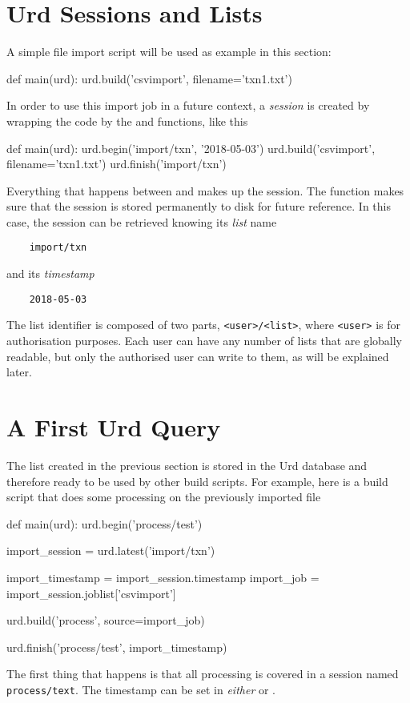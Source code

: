 \section{Urd Sessions and Lists}
A simple file import script will be used as example in this section:
\begin{python}
def main(urd):
    urd.build('csvimport', filename='txn1.txt')
\end{python}
In order to use this import job in a future context,
a \textsl{session} is created by wrapping the code by
the  and  functions, like this
\begin{python}
def main(urd):
    urd.begin('import/txn', '2018-05-03')
    urd.build('csvimport', filename='txn1.txt')
    urd.finish('import/txn')
\end{python}
Everything that happens between  and 
makes up the session.  The  function makes sure that
the session is stored permanently to disk for future reference.  In
this case, the session can be retrieved knowing its \textsl{list} name
\begin{verbatim}
    import/txn
\end{verbatim}
and its \textsl{timestamp}
\begin{verbatim}
    2018-05-03
\end{verbatim}
The list identifier is composed of two parts, \texttt{<user>/<list>}, where
\texttt{<user>} is for authorisation purposes.  Each user can
have any number of lists that are globally readable, but only the
authorised user can write to them, as will be explained later.



\section{A First Urd Query}
The list created in the previous section is stored in the Urd database
and therefore ready to be used by other build scripts.  For example,
here is a build script that does some processing on the previously
imported file
\begin{python}
def main(urd):
    urd.begin('process/test')

    import_session = urd.latest('import/txn')

    import_timestamp = import_session.timestamp
    import_job       = import_session.joblist['csvimport']

    urd.build('process', source=import_job)

    urd.finish('process/test', import_timestamp)
\end{python}
The first thing that happens is that all processing is covered in a
session named \texttt{process/text}.  The timestamp can be set
in \textsl{either}  or .

